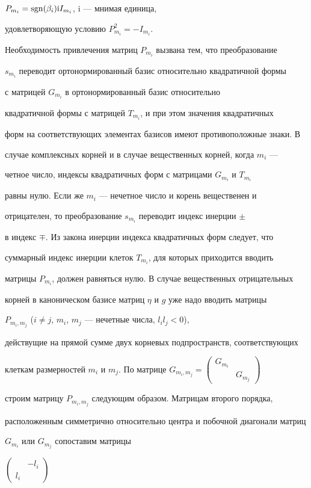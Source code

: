 $P_{m_i}=\operatorname{sgn}(\beta_i){\mathrm i}I_{m_i}$, $\mathrm i$ --- мнимая единица,


удовлетворяющую условию $P_{m_i}^2=-I_{m_i}$.


Необходимость привлечения матриц $P_{m_i}$ вызвана тем, что преобразование


$s_{m_i}$ переводит ортонормированный базис относительно квадратичной формы 


с матрицей $G_{m_i}$ в ортонормированный базис относительно 


квадратичной формы с матрицей $T_{m_i}$, и при этом значения квадратичных 


форм на соответствующих элементах базисов имеют противоположные знаки. В 


случае комплексных корней и в случае вещественных корней, когда $m_i$ ---


четное число, индексы квадратичных форм с матрицами $G_{m_i}$ и $T_{m_i}$ 


равны нулю. Если же $m_i$ --- нечетное число и корень вещественен и 


отрицателен, то преобразование $s_{m_i}$ переводит индекс инерции $\pm$


в индекс $\mp$. Из закона инерции индекса квадратичных форм следует, что


суммарный индекс инерции клеток $T_{m_i}$, для которых приходится вводить


матрицы $P_{m_i}$, должен равняться нулю. В случае вещественных отрицательных 


корней в каноническом базисе матриц $\eta$ и $g$ уже надо вводить матрицы


$P_{m_i,m_j}$ ($i\ne j$, $m_i$, $m_j$ --- нечетные числа, $l_il_j<0$),


действущие на прямой сумме двух корневых подпространств, соответствующих 


клеткам размерностей $m_i$ и $m_j$. По матрице $G_{m_i,m_j}=


\left(\begin{smallmatrix}G_{m_i}&\\&G_{m_j}\end{smallmatrix}\right)$


строим матрицу $P_{m_i,m_j}$ следующим образом. Матрицам второго порядка,


расположенным симметрично относительно центра и побочной диагонали матриц


$G_{m_i}$ или $G_{m_j}$ сопоставим матрицы


$\left(\begin{smallmatrix}&-l_i\\l_i&\end{smallmatrix}\right)$


